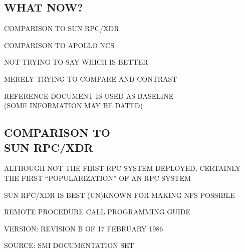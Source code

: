 
\begin{bwslide}
\part	{WHAT NOW?}\bf

\begin{nrtc}
\item	COMPARISON TO SUN RPC/XDR

\item	COMPARISON TO APOLLO NCS
\end{nrtc}
\end{bwslide}


\begin{bwslide}

\begin{nrtc}
\item	NOT TRYING TO SAY WHICH IS BETTER

\item	MERELY TRYING TO COMPARE AND CONTRAST

\item	REFERENCE DOCUMENT IS USED AS BASELINE\\
	(SOME INFORMATION MAY BE DATED)
\end{nrtc}
\end{bwslide}


\begin{bwslide}
\part*	{COMPARISON TO\\ SUN RPC/XDR}\bf

\begin{nrtc}
\item	ALTHOUGH NOT THE FIRST RPC SYSTEM DEPLOYED,
	CERTAINLY THE FIRST ``POPULARIZATION'' OF AN RPC SYSTEM

\item	SUN RPC/XDR IS BEST (UN)KNOWN FOR MAKING NFS POSSIBLE
\end{nrtc}
\end{bwslide}


\begin{bwslide}

\begin{nrtc}
\item	REMOTE PROCEDURE CALL PROGRAMMING GUIDE
    \begin{nrtc}
    \item	VERSION: REVISION B OF 17 FEBRUARY 1986

    \item	SOURCE: SMI DOCUMENTATION SET
    \end{nrtc}
\end{nrtc}
\end{bwslide}


